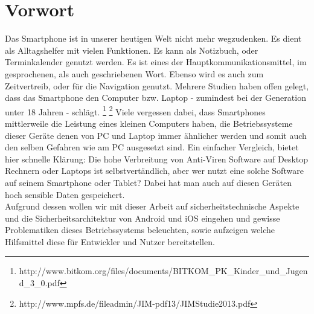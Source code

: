 \section{Vorwort}
	Das Smartphone ist in unserer heutigen Welt nicht mehr wegzudenken. Es dient
	als Alltagshelfer mit vielen Funktionen. Es kann als Notizbuch, oder
	Terminkalender genutzt werden. Es ist eines der Hauptkommunikationsmittel, im
	gesprochenen, als auch geschriebenen Wort. Ebenso wird es auch zum
	Zeitvertreib, oder für die Navigation genutzt. Mehrere Studien haben offen 
	gelegt, dass das Smartphone den Computer bzw. Laptop - zumindest bei der
	Generation unter 18 Jahren - schlägt.
	\footnote{http://www.bitkom.org/files/documents/BITKOM\_PK\_Kinder\_und\_Jugend\_3\_0.pdf}
	\footnote{http://www.mpfs.de/fileadmin/JIM-pdf13/JIMStudie2013.pdf}
	Viele vergessen dabei, dass Smartphones mittlerweile die Leistung eines kleinen
	Computers haben, die Betriebssysteme dieser Geräte denen von PC und Laptop
	immer ähnlicher werden und somit auch den selben Gefahren wie am PC ausgesetzt
	sind. Ein einfacher Vergleich, bietet hier schnelle	Klärung: Die hohe
	Verbreitung von Anti-Viren Software auf Desktop Rechnern oder Laptops ist
	selbstvertändlich, aber wer nutzt eine solche Software auf seinem
	Smartphone oder Tablet? Dabei hat man auch auf diesen Geräten hoch sensible
	Daten gespeichert.\\
	Aufgrund dessen wollen wir mit dieser Arbeit auf sicherheitstechnische Aspekte
	und die Sicherheitsarchitektur von Android und iOS eingehen und gewisse
	Problematiken dieses Betriebssystems beleuchten, sowie aufzeigen welche
	Hilfsmittel diese für Entwickler und Nutzer bereitstellen.
